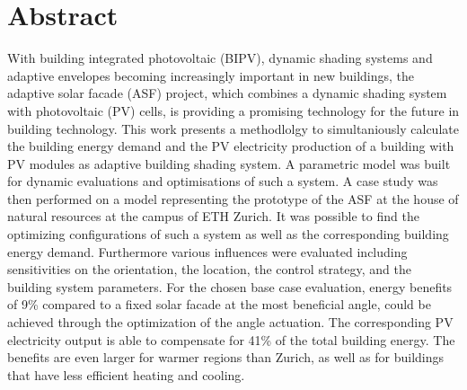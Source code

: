 \chapter*{Abstract}
With building integrated photovoltaic (BIPV), dynamic shading systems and adaptive envelopes becoming increasingly important in new buildings, the adaptive solar facade (ASF) project, which combines a dynamic shading system with photovoltaic (PV) cells, is providing a promising technology for the future in building technology. This work presents a methodlolgy to simultaniously calculate the building energy demand and the PV electricity production of a building with PV modules as adaptive building shading system. A parametric model was built for dynamic evaluations and optimisations of such a system. A case study was then performed on a model representing the prototype of the ASF at the house of natural resources at the campus of ETH Zurich. It was possible to find the optimizing configurations of such a system as well as the corresponding building energy demand. Furthermore various influences were evaluated including sensitivities on the orientation, the location, the control strategy, and the building system parameters. For the chosen base case evaluation, energy benefits of 9\% compared to a fixed solar facade at the most beneficial angle, could be achieved through the optimization of the angle actuation. The corresponding PV electricity output is able to compensate for 41\% of the total building energy. The benefits are even larger for warmer regions than Zurich, as well as for buildings that have less efficient heating and cooling. 
\newpage